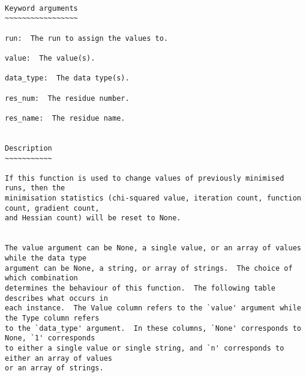 {\scriptsize
\begin{verbatim}

Keyword arguments
~~~~~~~~~~~~~~~~~

run:  The run to assign the values to.

value:  The value(s).

data_type:  The data type(s).

res_num:  The residue number.

res_name:  The residue name.


Description
~~~~~~~~~~~

If this function is used to change values of previously minimised runs, then the
minimisation statistics (chi-squared value, iteration count, function count, gradient count,
and Hessian count) will be reset to None.


The value argument can be None, a single value, or an array of values while the data type
argument can be None, a string, or array of strings.  The choice of which combination
determines the behaviour of this function.  The following table describes what occurs in
each instance.  The Value column refers to the `value' argument while the Type column refers
to the `data_type' argument.  In these columns, `None' corresponds to None, `1' corresponds
to either a single value or single string, and `n' corresponds to either an array of values
or an array of strings.


\end{verbatim}}
